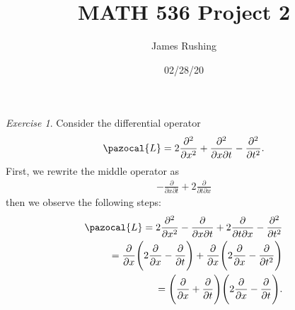 \documentclass[12pt,oneside]{amsart}
\title{MATH 536 Project 2}
\author{James Rushing}
\date{02/28/20}
\theoremstyle{definition}
\theoremstyle{remark}
\newtheorem{exer}{Exercise}
\numberwithin{equation}{exer}
\newcommand{\Lb}{\pazocal{L}}
\begin{document}
\maketitle
\begin{exer} 
\indent\newline
Consider the differential operator
\begin{align*}
    \Lb = 2 \frac{\partial^2}{\partial x^2} + \frac{\partial^2}{\partial x \partial t} - \frac{\partial^2}{\partial t^2}.
\end{align*}
First, we rewrite the middle operator as
\begin{align*}
-\frac{\partial}{\partial x \partial t} + 2\frac{\partial}{\partial t \partial x}
\end{align*}
then we observe the following steps:
\begin{align*}
    \Lb = 2 \frac{\partial^2}{\partial x^2}  -\frac{\partial}{\partial x \partial t} + 2\frac{\partial}{\partial t \partial x}- \frac{\partial^2}{\partial t^2}\\
    = \frac{\partial}{\partial x}\Bigg(2\frac{\partial}{\partial x} - \frac{\partial}{\partial t}\Bigg) + \frac{\partial}{\partial x}\Bigg(2\frac{\partial}{\partial x} - \frac{\partial}{\partial t^2}\Bigg)\\
    = \Bigg(\frac{\partial}{\partial x} + \frac{\partial}{\partial t}\Bigg)\Bigg(2\frac{\partial}{\partial x} - \frac{\partial}{\partial t}\Bigg).
\end{align*}
\end{exer}
\newpage
\indent \newline
\end{document}
